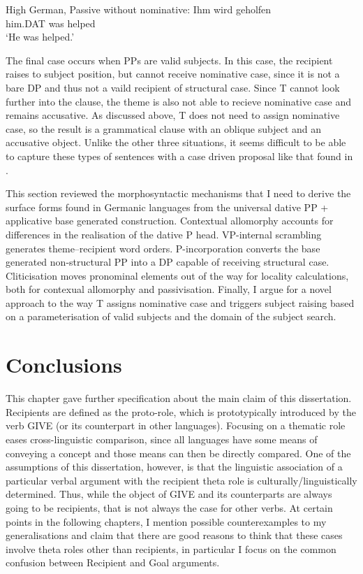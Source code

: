 \begin{exe}
	\ex High German, Passive without nominative:
	\gll Ihm wird geholfen\label{ex:german-help-pass}\\
	him.DAT was helped\\
	\trans `He was helped.'
\end{exe}

The final case occurs when PPs are valid subjects. In this case, the recipient raises to subject position, but cannot receive nominative case, since it is not a bare DP and thus not a vaild recipient of structural case. Since T cannot look further into the clause, the theme is also not able to recieve nominative case and remains accusative. As discussed above, T does not need to assign nominative case, so the result is a grammatical clause with an oblique subject and an accusative object. Unlike the other three situations, it seems difficult to be able to capture these types of sentences with a case driven proposal like that found in \citet{McGinnis.1998b}.

This section reviewed the morphosyntactic mechanisms that I need to derive the surface forms found in Germanic languages from the universal dative PP + applicative base generated construction. Contextual allomorphy accounts for differences in the realisation of the dative P head. VP-internal scrambling generates theme--recipient word orders. P-incorporation converts the base generated non-structural PP into a DP capable of receiving structural case. Cliticisation moves pronominal elements out of the way for locality calculations, both for contexual allomorphy and passivisation. Finally, I argue for a novel approach to the way T assigns nominative case and triggers subject raising based on a parameterisation of valid subjects and the domain of the subject search.

\section{Conclusions}
This chapter gave further specification about the main claim of this dissertation. Recipients are defined as the proto-role, which is prototypically introduced by the verb GIVE (or its counterpart in other languages). Focusing on a thematic role eases cross-linguistic comparison, since all languages have some means of conveying a concept and those means can then be directly compared. One of the assumptions of this dissertation, however, is that the linguistic association of a particular verbal argument with the recipient theta role is culturally/linguistically determined. Thus, while the object of GIVE and its counterparts are always going to be recipients, that is not always the case for other verbs. At certain points in the following chapters, I mention possible counterexamples to my generalisations and claim that there are good reasons to think that these cases involve theta roles other than recipients, in particular I focus on the common confusion between Recipient and Goal arguments.

